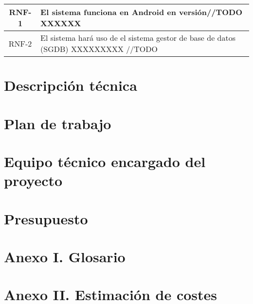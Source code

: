 \documentclass{article}
\begin{document}
\begin{table}[H]
    \centering
    \begin{tabular}{| c | p{30em} |}
        \hline
        RNF-1 & El sistema funciona en Android en versión//TODO XXXXXX  \\ \hline
        RNF-2 & El sistema hará uso de el sistema gestor de base de datos (SGDB) XXXXXXXXX //TODO \\ \hline
    \end{tabular}
\end{table}







\section{Descripción técnica}



\section{Plan de trabajo}

\section{Equipo técnico encargado del proyecto}

\section{Presupuesto}

\section*{Anexo I. Glosario}

\section*{Anexo II. Estimación de costes}

\end{document}
